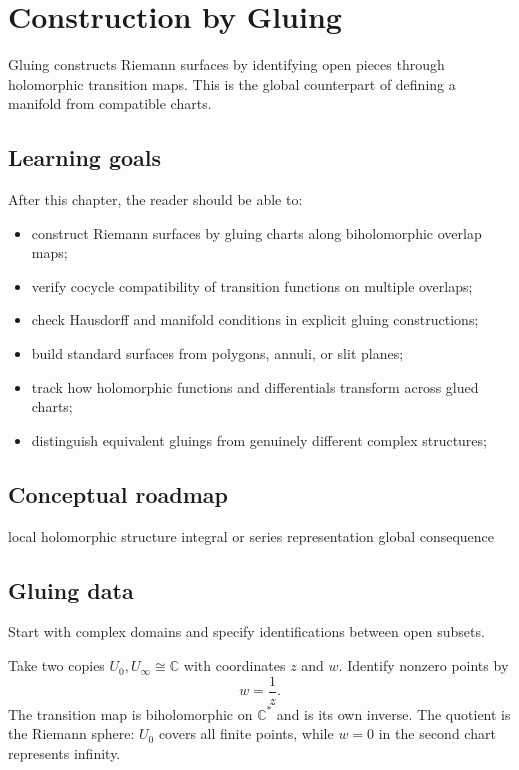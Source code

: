 \chapter{Construction by Gluing}
\label{ch:iv25}

Gluing constructs Riemann surfaces by identifying open pieces through holomorphic transition maps. This is the global counterpart of defining a manifold from compatible charts.

\section*{Learning goals}
After this chapter, the reader should be able to:
\begin{itemize}
\item construct Riemann surfaces by gluing charts along biholomorphic overlap maps;
\item verify cocycle compatibility of transition functions on multiple overlaps;
\item check Hausdorff and manifold conditions in explicit gluing constructions;
\item build standard surfaces from polygons, annuli, or slit planes;
\item track how holomorphic functions and differentials transform across glued charts;
\item distinguish equivalent gluings from genuinely different complex structures;
\end{itemize}
\section*{Conceptual roadmap}
\volroadmap
  {local holomorphic structure}
  {integral or series representation}
  {global consequence}

\section{Gluing data}
Start with complex domains and specify identifications between open subsets.

\begin{example}\label{ex:iv25-expand-01}
Take two copies \(U_0,U_\infty\cong\mathbb C\) with coordinates \(z\) and \(w\). Identify nonzero points by
\[
w=\frac1z.
\]
The transition map is biholomorphic on \(\mathbb C^*\) and is its own inverse. The quotient is the Riemann sphere: \(U_0\) covers all finite points, while \(w=0\) in the second chart represents infinity.
\end{example}
